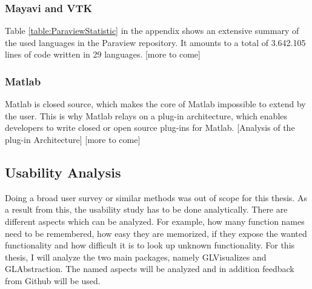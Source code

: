 \subsubsection{Mayavi and VTK}

Table \ref{table:ParaviewStatistic} in the appendix shows an extensive summary of the used languages in the Paraview repository.
It amounts to a total of 3.642.105 lines of code written in 29 languages.
[more to come]

\subsubsection{Matlab}

Matlab is closed source, which makes the core of Matlab impossible to extend by the user.
This is why Matlab relays on a plug-in architecture, which enables developers to write closed or open source plug-ins for Matlab.
[Analysis of the plug-in Architecture]
[more to come]


\subsection{Usability Analysis}
Doing a broad user survey or similar methods was out of scope for this thesis.
As a result from this, the usability study has to be done analytically.
There are different aspects which can be analyzed. For example, how many function names need to be remembered, how easy they are memorized, if they expose the wanted functionality and how difficult it is to look up unknown functionality.
For this thesis, I will analyze the two main packages, namely GLVisualizes and GLAbstraction. 
The named aspects will be analyzed and in addition feedback from Github will be used.

